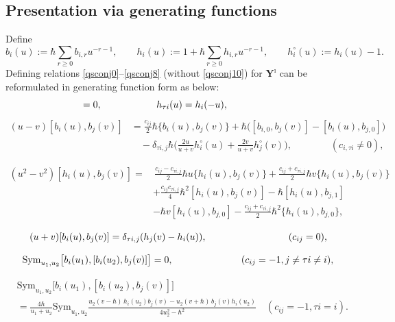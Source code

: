 \documentclass[11pt,reqno]{amsart}
\numberwithin{equation}{section}
\theoremstyle{definition}
\theoremstyle{remark}
\newcommand{\beq}{\begin{equation}}
\newcommand{\eeq}{\end{equation}}
\newcommand{\gge}{\geqslant}
\newcommand{\Sym}{{\mathrm{Sym}}}
\newcommand{\Yi}{{\mathbf{Y}^\imath}}
\def \h{\hbar}
\def \Sym{\mathrm{Sym}}
\begin{document}
\subsection{Presentation via generating functions}
\label{sec:geniQG}
Define
\[
b_{i}(u):=\h \sum_{r\gge 0}b_{i,r}u^{-r-1},\qquad h_{i}(u):=1+\h \sum_{r\gge 0}h_{i,r}u^{-r-1},\qquad h_i^{\circ}(u):=h_i(u)-1.
\]
Defining relations \eqref{qsconj0}--\eqref{qsconj8} (without \eqref{qsconj10}) for $\Yi$ can be reformulated in generating function form as below:
\beq
[h_{i}(u),h_j(v)]=0,\hskip2cm  h_{\tau i}(u)=h_i(-u),\qquad \hskip1cm
\eeq
\beq
\begin{split}
(u-v)[b_i(u),b_j(v)]&=\frac{c_{ij}}{2}\h\{b_i(u),b_j(v)\}
+\h\big([b_{i,0},b_j(v)]-[b_i(u),b_{j,0}]\big)
\\&\quad  -\delta_{\tau i,j}  \h \Big(\frac{2u}{u+v} h_i^\circ(u)+\frac{2v}{u+v}h_j^\circ(v)\Big),  \qquad\qquad (c_{i,\tau i}\ne 0),
\end{split}
\eeq

\beq
\begin{split}
(u^2-v^2)[h_i(u),b_j(v)]=&\,\frac{c_{ij}-c_{\tau i,j}}{2}\h u\{h_i(u),b_j(v)\}+\frac{c_{ij}+c_{\tau i,j}}{2}\h v\{h_i(u),b_j(v)\}\\
&+\frac{c_{ij}c_{\tau i,j}}{4}\h^2[h_i(u),b_j(v)]-\h[h_i(u),b_{j,1}]\\
&-\h v[h_i(u),b_{j,0}]-\frac{c_{ij}+c_{\tau i,j}}{2}\h^2\{h_i(u),b_{j,0}\},
\end{split}
\eeq

\beq
(u+v)[b_{i}(u),b_{j}(v)]=\delta_{\tau i,j}(h_{j}(v)-h_i(u)), \hskip 3cm (c_{ij}=0),
\eeq

\beq\label{gconj5}
\Sym_{u_1,u_2}\big[b_{i}(u_1),[b_{i}(u_2), b_{j}(v) ]\big]=0, \hskip 2.5cm (c_{ij}=-1,j\ne\tau i\ne i),
\eeq

\beq\label{gconj6} 
\begin{split}
&\Sym_{u_1,u_2}\big[b_{i}(u_1),[b_{i}(u_2), b_{j}(v) ]\big]
\\
&=\frac{4\h }{u_1 + u_2}\Sym_{u_1,u_2}  \frac{u_2(v-\h )\, h_i(u_2) b_j(v)- u_2(v+\h  )\, b_j(v)h_i(u_2) }{4u_2^2- \h^2}
\quad (c_{ij}=-1,\tau i=i).
\end{split}
\eeq
\end{document}

